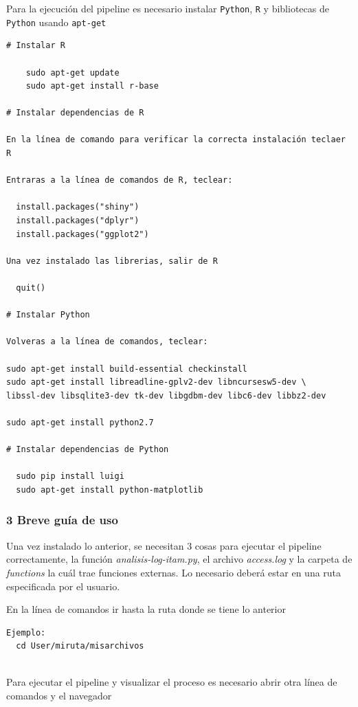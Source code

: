 \documentclass[]{article}
\begin{document}
Para la ejecución del pipeline es necesario instalar \texttt{Python},
\texttt{R} y bibliotecas de \texttt{Python} usando \texttt{apt-get}

\begin{verbatim}
# Instalar R

    sudo apt-get update
    sudo apt-get install r-base
    
# Instalar dependencias de R

En la línea de comando para verificar la correcta instalación teclaer R

Entraras a la línea de comandos de R, teclear:

  install.packages("shiny")
  install.packages("dplyr")
  install.packages("ggplot2")
  
Una vez instalado las librerias, salir de R
  
  quit()

# Instalar Python

Volveras a la línea de comandos, teclear:

sudo apt-get install build-essential checkinstall
sudo apt-get install libreadline-gplv2-dev libncursesw5-dev \
libssl-dev libsqlite3-dev tk-dev libgdbm-dev libc6-dev libbz2-dev

sudo apt-get install python2.7

# Instalar dependencias de Python

  sudo pip install luigi
  sudo apt-get install python-matplotlib
\end{verbatim}

\subsubsection{3 Breve guía de uso}\label{breve-guia-de-uso}

Una vez instalado lo anterior, se necesitan 3 cosas para ejecutar el
pipeline correctamente, la función \emph{analisis-log-itam.py}, el
archivo \emph{access.log} y la carpeta de \emph{functions} la cuál trae
funciones externas. Lo necesario deberá estar en una ruta especificada
por el usuario.

En la línea de comandos ir hasta la ruta donde se tiene lo anterior

\begin{verbatim}
Ejemplo:
  cd User/miruta/misarchivos
  
\end{verbatim}

Para ejecutar el pipeline y visualizar el proceso es necesario abrir
otra línea de comandos y el navegador
\end{document}
